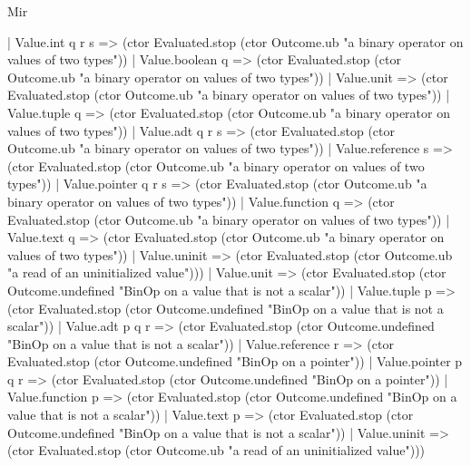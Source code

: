 \begin{lexlean}{Mir}
\begin{semanticmodule}
{      | Value.int q r s => (ctor Evaluated.stop (ctor Outcome.ub "a binary operator on values of two types"))
      | Value.boolean q => (ctor Evaluated.stop (ctor Outcome.ub "a binary operator on values of two types"))
      | Value.unit => (ctor Evaluated.stop (ctor Outcome.ub "a binary operator on values of two types"))
      | Value.tuple q => (ctor Evaluated.stop (ctor Outcome.ub "a binary operator on values of two types"))
      | Value.adt q r s => (ctor Evaluated.stop (ctor Outcome.ub "a binary operator on values of two types"))
      | Value.reference s => (ctor Evaluated.stop (ctor Outcome.ub "a binary operator on values of two types"))
      | Value.pointer q r s => (ctor Evaluated.stop (ctor Outcome.ub "a binary operator on values of two types"))
      | Value.function q => (ctor Evaluated.stop (ctor Outcome.ub "a binary operator on values of two types"))
      | Value.text q => (ctor Evaluated.stop (ctor Outcome.ub "a binary operator on values of two types"))
      | Value.uninit => (ctor Evaluated.stop (ctor Outcome.ub "a read of an uninitialized value")))
    | Value.unit => (ctor Evaluated.stop (ctor Outcome.undefined "BinOp on a value that is not a scalar"))
    | Value.tuple p => (ctor Evaluated.stop (ctor Outcome.undefined "BinOp on a value that is not a scalar"))
    | Value.adt p q r => (ctor Evaluated.stop (ctor Outcome.undefined "BinOp on a value that is not a scalar"))
    | Value.reference r => (ctor Evaluated.stop (ctor Outcome.undefined "BinOp on a pointer"))
    | Value.pointer p q r => (ctor Evaluated.stop (ctor Outcome.undefined "BinOp on a pointer"))
    | Value.function p => (ctor Evaluated.stop (ctor Outcome.undefined "BinOp on a value that is not a scalar"))
    | Value.text p => (ctor Evaluated.stop (ctor Outcome.undefined "BinOp on a value that is not a scalar"))
    | Value.uninit => (ctor Evaluated.stop (ctor Outcome.ub "a read of an uninitialized value")))
}


\end{semanticmodule}
\end{lexlean}

